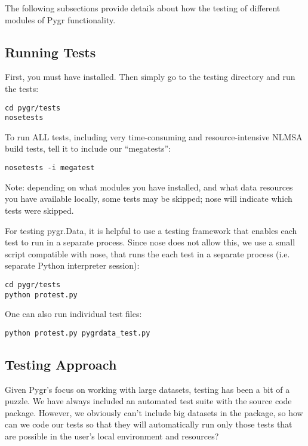 \documentclass{howto}
\begin{document}
The following subsections provide details about how the testing of different
modules of Pygr functionality. 

\subsection{Running Tests}
First, you must have  installed.  Then simply go to 
the testing directory and run the tests:
\begin{verbatim}
cd pygr/tests
nosetests
\end{verbatim}
To run ALL tests, including very time-consuming and resource-intensive
NLMSA build tests, tell it to include our ``megatests'':
\begin{verbatim}
nosetests -i megatest
\end{verbatim}
Note: depending on what modules you have installed, and what data resources
you have available locally, some tests may be skipped; nose will indicate
which tests were skipped.

For testing pygr.Data, it is helpful to use a testing framework
that enables each test to run in a separate process.  Since nose does
not allow this, we use a small script compatible with nose, that
runs the each test in a separate process (i.e. separate Python interpreter
session):
\begin{verbatim}
cd pygr/tests
python protest.py
\end{verbatim}
One can also run individual test files:
\begin{verbatim}
python protest.py pygrdata_test.py
\end{verbatim}

\subsection{Testing Approach}
\label{test-utils}
Given Pygr's focus on working with large datasets, testing has been a bit of a puzzle.  
We have always included an automated test suite with the source code package.  
However, we obviously can't include big datasets in the package, so how can 
we code our tests so that they will automatically run only those tests that 
are possible in the user's local environment and resources?  
\end{document}
